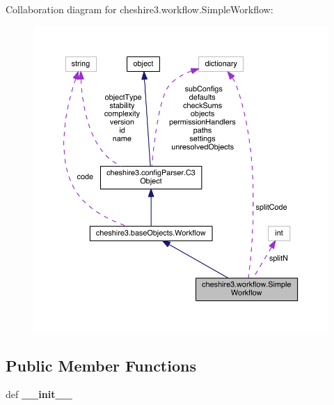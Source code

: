 Collaboration diagram for cheshire3.\-workflow.\-Simple\-Workflow\-:
\nopagebreak
\begin{figure}[H]
\begin{center}
\leavevmode
\includegraphics[width=350pt]{classcheshire3_1_1workflow_1_1_simple_workflow__coll__graph}
\end{center}
\end{figure}
\subsection*{Public Member Functions}
\begin{DoxyCompactItemize}
\item 
\hypertarget{classcheshire3_1_1workflow_1_1_simple_workflow_a4155c0bccae45b4da3b702e3e388ec4c}{def {\bfseries \-\_\-\-\_\-init\-\_\-\-\_\-}}\label{classcheshire3_1_1workflow_1_1_simple_workflow_a4155c0bccae45b4da3b702e3e388ec4c}

\end{DoxyCompactItemize}
